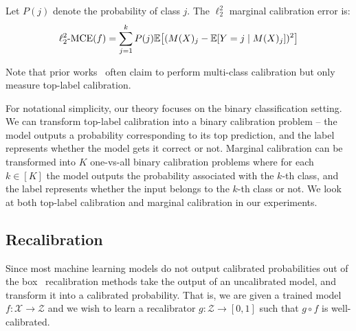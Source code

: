 \begin{definition}
\label{dfn:marginal-ce}
Let $P(j)$ denote the probability of class $j$. The $\ell_2^2$ marginal calibration error is:
\begin{align}
\ell_2^2\mbox{-MCE}(f) = \sum_{j = 1}^k P(j) \mathbb{E}\big[ (M(X)_j - \mathbb{E}[Y = j \mid M(X)_j])^2 \big]
\end{align}
\end{definition}

Note that prior works~\cite{guo2017calibration, hendrycks2019anomaly, hendrycks2019pretraining} often claim to perform multi-class calibration but only measure top-label calibration.


For notational simplicity, our theory focuses on the binary classification setting. We can transform top-label calibration into a binary calibration problem -- the model outputs a probability corresponding to its top prediction, and the label represents whether the model gets it correct or not. Marginal calibration can be transformed into $K$ one-vs-all binary calibration problems where for each $k \in [K]$ the model outputs the probability associated with the $k$-th class, and the label represents whether the input belongs to the $k$-th class or not. We look at both top-label calibration and marginal calibration in our experiments.

\subsection{Recalibration}

Since most machine learning models do not output calibrated probabilities out of the box~\cite{guo2017calibration, zadrozny2001calibrated} recalibration methods take the output of an uncalibrated model, and transform it into a calibrated probability. That is, we are given a trained model $f: \mathcal{X} \to \mathcal{Z}$ and we wish to learn a recalibrator $g : \mathcal{Z} \to [0, 1]$ such that $g \circ f$ is well-calibrated.

